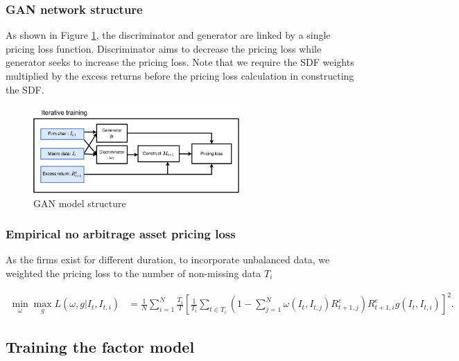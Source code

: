 \documentclass[12pt]{article}
\begin{document}
\newpage

\hypertarget{gan-network-structure}{%
\subsubsection{GAN network structure}\label{gan-network-structure}}

As shown in Figure \ref{fig:ganDiagram}, the discriminator and generator
are linked by a single pricing loss function. Discriminator
aims to decrease the pricing loss while generator seeks to
increase the pricing loss. Note that we require the SDF
weights multiplied by the excess returns before the pricing
loss calculation in constructing the SDF.

\begin{figure}
\centering
\includegraphics[width=0.7\textwidth,height=\textheight]{./src/model}
\caption{\label{fig:ganDiagram} GAN model structure}
\end{figure}

\hypertarget{empirical-no-arbitrage-asset-pricing-loss}{%
\subsubsection{Empirical no arbitrage asset pricing loss}\label{empirical-no-arbitrage-asset-pricing-loss}}

As the firms exist for different
duration, to incorporate unbalanced data, we weighted the
pricing loss to the number of non-missing data
\(T_i\)

\begin{align*}
\min_{\omega} \max_{g} L(\omega, g|I_t, I_{t, i}) &=
\frac{1}{N} \sum_{i=1}^N 
\frac{T_i}{T}
\left[ 
\frac{1}{T_i}
\sum_{t\in T_i}
\left( 1 - \sum_{j=1}^N \omega(I_t, I_{t, j}) R^e_{t+1, j} \right)
R^e_{t+1, i}g(I_t, I_{t, i})
\right]^2.
\end{align*}

\hypertarget{training-the-factor-model}{%
\subsection{Training the factor model}\label{training-the-factor-model}}
\end{document}
